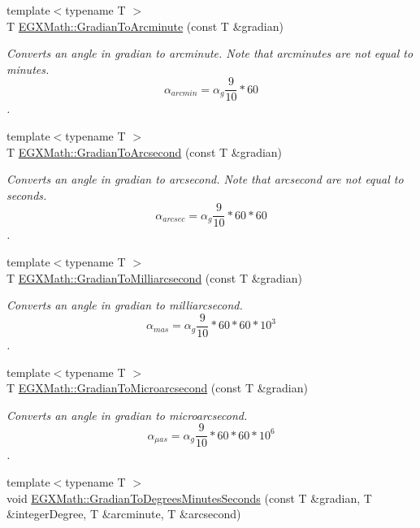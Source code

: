\begin{DoxyCompactItemize}
{\footnotesize template$<$typename T $>$ }\\T \mbox{\hyperlink{group___e_g_x_math-_conversions-_angle_conversions-_gradian_ga67ef7daad49b0d73c39c52d426ab46a5}{E\+G\+X\+Math\+::\+Gradian\+To\+Arcminute}} (const T \&gradian)
\begin{DoxyCompactList}\small\item\em Converts an angle in gradian to arcminute. Note that arcminutes are not equal to minutes. \[\alpha_{arcmin}=\alpha_{g}\frac{9}{10} * 60\]. \end{DoxyCompactList}\item 
{\footnotesize template$<$typename T $>$ }\\T \mbox{\hyperlink{group___e_g_x_math-_conversions-_angle_conversions-_gradian_gac768fd444195264165d332f2f5e84d92}{E\+G\+X\+Math\+::\+Gradian\+To\+Arcsecond}} (const T \&gradian)
\begin{DoxyCompactList}\small\item\em Converts an angle in gradian to arcsecond. Note that arcsecond are not equal to seconds. \[\alpha_{arcsec}=\alpha_{g}\frac{9}{10} * 60 * 60\]. \end{DoxyCompactList}\item 
{\footnotesize template$<$typename T $>$ }\\T \mbox{\hyperlink{group___e_g_x_math-_conversions-_angle_conversions-_gradian_gad77ea0956413029f4166dce8d7f5ce83}{E\+G\+X\+Math\+::\+Gradian\+To\+Milliarcsecond}} (const T \&gradian)
\begin{DoxyCompactList}\small\item\em Converts an angle in gradian to milliarcsecond. \[\alpha_{mas}=\alpha_{g}\frac{9}{10} * 60 * 60 * 10^3\]. \end{DoxyCompactList}\item 
{\footnotesize template$<$typename T $>$ }\\T \mbox{\hyperlink{group___e_g_x_math-_conversions-_angle_conversions-_gradian_gab7781c860ea3ab9c9cf76ab639846a07}{E\+G\+X\+Math\+::\+Gradian\+To\+Microarcsecond}} (const T \&gradian)
\begin{DoxyCompactList}\small\item\em Converts an angle in gradian to microarcsecond. \[\alpha_{\mu as}=\alpha_{g}\frac{9}{10} * 60 * 60 * 10^6\]. \end{DoxyCompactList}\item 
{\footnotesize template$<$typename T $>$ }\\void \mbox{\hyperlink{group___e_g_x_math-_conversions-_angle_conversions-_gradian_ga5c81967ddb8f677634d161713174e419}{E\+G\+X\+Math\+::\+Gradian\+To\+Degrees\+Minutes\+Seconds}} (const T \&gradian, T \&integer\+Degree, T \&arcminute, T \&arcsecond)

\end{DoxyCompactItemize}
